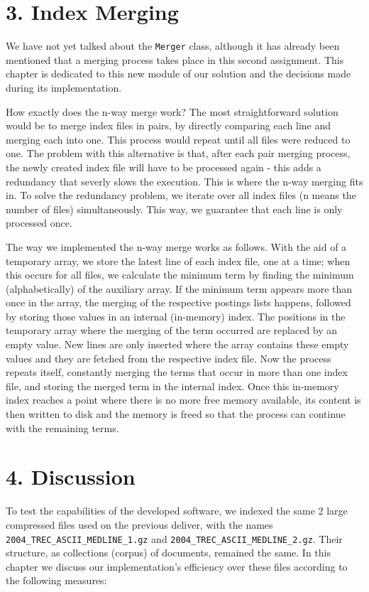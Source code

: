 \documentclass[12pt]{article}
\begin{document}
\newpage
\section*{3. Index Merging}

We have not yet talked about the \texttt{Merger} class, although it has 
already been mentioned that a merging process takes place in this second 
assignment.
This chapter is dedicated to this new module of our solution and the 
decisions made during its implementation.

How exactly does the n-way merge work? 
The most straightforward solution would be to merge index files in pairs, 
by directly comparing each line and merging each into one. This process 
would repeat until all files were reduced to one.
The problem with this alternative is that, after each pair merging process, 
the newly created index file will have to be processed again - this adds a 
redundancy that severly slows the execution.
This is where the n-way merging fits in.
To solve the redundancy problem, we iterate over all index files (n means 
the number of files) simultaneously. 
This way, we guarantee that each line is only processed once.

The way we implemented the n-way merge works as follows.
With the aid of a temporary array, we store the latest line of each index 
file, one at a time; when this occurs for all files, we calculate the 
minimum term by finding the minimum (alphabetically) of the auxiliary array. 
If the minimum term appears more than once in the array, the merging of the 
respective postings lists happens, followed by storing those values in an 
internal (in-memory) index.
The positions in the temporary array where the merging of the term occurred
are replaced by an empty value.
New lines are only inserted where the array contains these empty values and 
they are fetched from the respective index file.
Now the process repeats itself, constantly merging the terms that occur in 
more than one index file, and storing the merged term in the internal index.
Once this in-memory index reaches a point where there is no more free memory 
available, its content is then written to disk and the memory is freed so 
that the process can continue with the remaining terms.

\newpage
\section*{4. Discussion}

To test the capabilities of the developed software, we indexed the same
2 large compressed files used on the previous deliver, with the names 
\texttt{2004\_TREC\_ASCII\_MEDLINE\_1.gz} and 
\texttt{2004\_TREC\_ASCII\_MEDLINE\_2.gz}.
Their structure, as collections (corpus) of documents, remained the same.
In this chapter we discuss our implementation's efficiency over these 
files according to the following measures:
\end{document}
